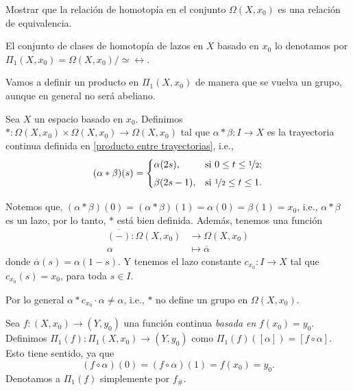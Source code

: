 \begin{ejercicio}
    Mostrar que la relación de homotopía en el conjunto $\Omega(X,x_0)$ es una relación de equivalencia.
\end{ejercicio}
\begin{definicion}
\label{def: fundamental_group}
    El conjunto de clases de homotopía de lazos en $X$ basado en $x_0$ lo denotamos por $\Pi_1(X,x_0)=\Omega(X,x_0)/\simeq\rel$.
\end{definicion}
Vamos a definir un producto en $\Pi_1(X,x_0)$ de manera que se vuelva un grupo, aunque en general no será abeliano.
\begin{definicion}
    Sea $X$ un espacio basado en $x_0$.
    Definimos $*:\Omega(X,x_0)\times \Omega(X,x_0)\to \Omega(X,x_0)$ tal que $\alpha*\beta:I\to X$ es la trayectoria continua definida en \ref{producto entre trayectorias}, i.e.,
    \[
(\alpha * \beta)(s) = 
\begin{cases} 
\alpha(2s), & \text{si } 0 \leq t \leq \nicefrac{1}{2}; \\[1ex]
\beta(2s - 1), & \text{si } \nicefrac{1}{2} \leq t \leq 1.
\end{cases}
\]
\end{definicion}
Notemos que, $(\alpha*\beta)(0)=(\alpha*\beta)(1)=\alpha(0)=\beta(1)=x_0$, i.e., $\alpha*\beta$ es un lazo, por lo tanto, $*$ está bien definida. Además, tenemos una función 
\begin{equation}
    \begin{split}
        \overline{(-)}:\Omega(X,x_0)&\to\Omega(X,x_0)\\
    \alpha&\mapsto \overline{\alpha}
    \end{split}
\end{equation}
donde $\overline{\alpha}(s)=\alpha(1-s)$. Y tenemos el lazo constante $c_{x_0}:I\to X$ tal que $c_{x_0}(s)=x_0$, para toda $s\in I$.
    \begin{nota}
        Por lo general $\alpha* c_{x_0}\cdot \alpha \neq \alpha$, i.e., $*$ no define un grupo en $\Omega(X,x_0)$.
    \end{nota}
    \begin{definicion}
    \label{def:funtor_fundamental}
        Sea $f:(X,x_0)\to(Y,y_0)$ una función continua \textit{basada en} $f(x_0)=y_0$. Definimos $\Pi_1(f):\Pi_1(X,x_0)\to(Y,y_0)$ como $\Pi_1(f)([ \alpha])=[f\circ \alpha]$. Esto tiene sentido, ya que 
        $$(f\circ\alpha)(0)=(f\circ\alpha)(1)=f(x_0)=y_0.$$ 
        Denotamos a $\Pi_1(f)$ simplemente por $f_\#$.
    \end{definicion}
